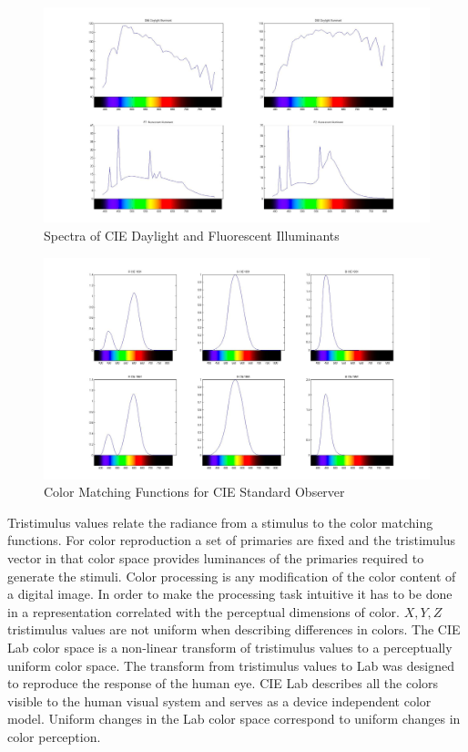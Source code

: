 \documentclass{amsart}
\theoremstyle{definition}
\theoremstyle{remark}
\numberwithin{equation}{section}
\begin{document}
\begin{figure}
  \caption{Spectra of CIE Daylight and Fluorescent Illuminants}
  \begin{center}
\includegraphics[width=12.0cm]{images/daylight_Flourcescent.jpg}
  \end{center}
\end{figure}

\begin{figure}
  \caption{Color Matching Functions for CIE Standard Observer}
  \begin{center}
\includegraphics[width=12.0cm]{images/XYZ_CMF.jpg}
  \end{center}
\end{figure}
Tristimulus values relate the radiance from a stimulus to the color matching functions.  For color reproduction a set of primaries are fixed and the  tristimulus vector in that color space provides luminances of the primaries required to generate the stimuli.  Color processing is any modification of the color content of a digital image. In order to make the processing task intuitive it has to be done in a representation correlated with the perceptual dimensions of color.  $X, Y, Z$ tristimulus values are not uniform when describing differences in colors.  The CIE Lab color space is a non-linear transform of tristimulus values to a perceptually uniform color space. The transform from tristimulus values to Lab was designed to reproduce the response of the human eye. CIE Lab describes all the colors visible to the human visual system and serves as a device independent color model.  Uniform changes in the Lab color space correspond to uniform changes in color perception.
\end{document}

